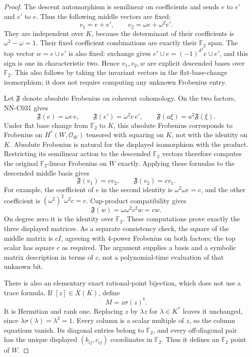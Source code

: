 \begin{proof}
The descent automorphism is semilinear on coefficients and sends $e$ to $e'$ and $e'$ to $e$. Thus the following middle vectors are fixed:
\[
                    v_1=e+e',\qquad
                    v_2=\omega e+\omega^2e'.
\]
They are independent over $K$, because the determinant of their coefficients is $\omega^2-\omega=1$. Their fixed coefficient combinations are exactly their $\mathbb F_2$ span. The top vector $w=e\cup e'$ is also fixed: exchange gives $e'\cup e=(-1)^{d^2}e\cup e'$, and this sign is one in characteristic two. Hence $v_1,v_2,w$ are explicit descended bases over $\mathbb F_2$. This also follows by taking the invariant vectors in the flat-base-change isomorphism; it does not require computing any unknown Frobenius entry.

Let $\mathfrak F$ denote absolute Frobenius on coherent cohomology. On the two factors, NN-C031 gives
\[
                \mathfrak F(e)=\omega c\,e,
                \qquad\mathfrak F(e')=\omega^2c\,e',
 \qquad \mathfrak F(a\xi)=a^2\mathfrak F(\xi).
\]
Under flat base change from $\mathbb F_2$ to $K$, this absolute Frobenius corresponds to Frobenius on $H^*(W,\mathcal O_W)$ tensored with squaring on $K$, not with the identity on $K$. Absolute Frobenius is natural for the displayed isomorphism with the product. Restricting its semilinear action to the descended $\mathbb F_2$ vectors therefore computes the original $\mathbb F_2$-linear Frobenius on $W$ exactly.
Applying these formulas to the descended middle basis gives
\[
       \mathfrak F(v_1)=c v_2,\qquad
       \mathfrak F(v_2)=c v_1.
\]
For example, the coefficient of $e$ in the second identity is
$\omega^2\omega c=c$, and the other coefficient is
$(\omega^2)^2\omega^2c=c$. Cup-product compatibility gives
\[
                 \mathfrak F(w)=\omega\omega^2c^2w=cw.
\]
On degree zero it is the identity over $\mathbb F_2$. These computations prove exactly the three displayed matrices. As a separate consistency check, the square of the middle matrix is $cI$, agreeing with $4$-power Frobenius on both factors; the top scalar has square $c$ as required. The argument supplies a basis and a symbolic matrix description in terms of $c$, not a polynomial-time evaluation of that unknown bit.

There is also an elementary exact rational-point bijection, which does not use a trace formula. If $[z]\in X(K)$, define
\[
                            M=z\sigma(z)^{\mathsf t}.
\]
It is Hermitian and rank one. Replacing $z$ by $\lambda z$ for $\lambda\in K^*$ leaves it unchanged, since $\lambda\sigma(\lambda)=\lambda^3=1$. Every column is a scalar multiple of $z$, so the column equations vanish. Its diagonal entries belong to $\mathbb F_2$, and every off-diagonal pair has the unique displayed $(b_{ij},c_{ij})$ coordinates in $\mathbb F_2$. Thus it defines an $\mathbb F_2$ point of $W$.


\end{proof}
